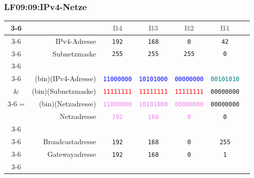 \begin{frame}[fragile]  
  \frametitle{LF09:09:IPv4-Netze}
  \vspace{0.2cm}
  \begin{footnotesize}
  \begin{center}
    \renewcommand{\arraystretch}{1.3}
    \begin{tabular}{cr|c|c|c|c|c|}
    \cline{3-6}
    & &  \textcolor{gray}{\tiny{B4}} & \textcolor{gray}{\tiny{B3}} & \textcolor{gray}{\tiny{B2}} 
    &  \textcolor{gray}{\tiny{B1}}  \\
	  \cline{3-6}
	  & IPv4-Adresse & \texttt{192} & \texttt{168} & \texttt{0} & \texttt{42} \\
    \cline{3-6}
    & Subnetzmaske & \texttt{255} & \texttt{255} & \texttt{255} & \texttt{0}\\
    \cline{3-6}\\
    \cline{3-6}
	  & (bin)(IPv4-Adresse) & \textcolor{blue}{\texttt{11000000}} & \textcolor{blue}{\texttt{10101000}} & \textcolor{blue}{\texttt{00000000}} & \textcolor{teal}{\texttt{00101010}} \\
    \& & (bin)(Subnetzmaske) & \textcolor{red}{\texttt{11111111}} & \textcolor{red}{\texttt{11111111}} & \textcolor{red}{\texttt{11111111}} & \texttt{00000000}\\
    \cline{3-6}
    = & (bin)(Netzadresse) & \textcolor{violet}{\texttt{11000000}} & \textcolor{violet}{\texttt{10101000}} & \textcolor{violet}{\texttt{00000000}} & \texttt{00000000} \\
   
    & Netzadresse & \textcolor{violet}{\texttt{192}} & \textcolor{violet}{\texttt{168}} & \textcolor{violet}{\texttt{0}} & \texttt{0} \\
    \cline{3-6}\\
    \cline{3-6}
    & Broadcastadresse & \texttt{192} & \texttt{168} & \texttt{0} & \texttt{255} \\
    \cline{3-6}
    & Gatewayadresse & \texttt{192} & \texttt{168} & \texttt{0} & \texttt{1} \\
    \cline{3-6}

  \end{tabular}
\end{center}
\end{footnotesize}
\end{frame}


